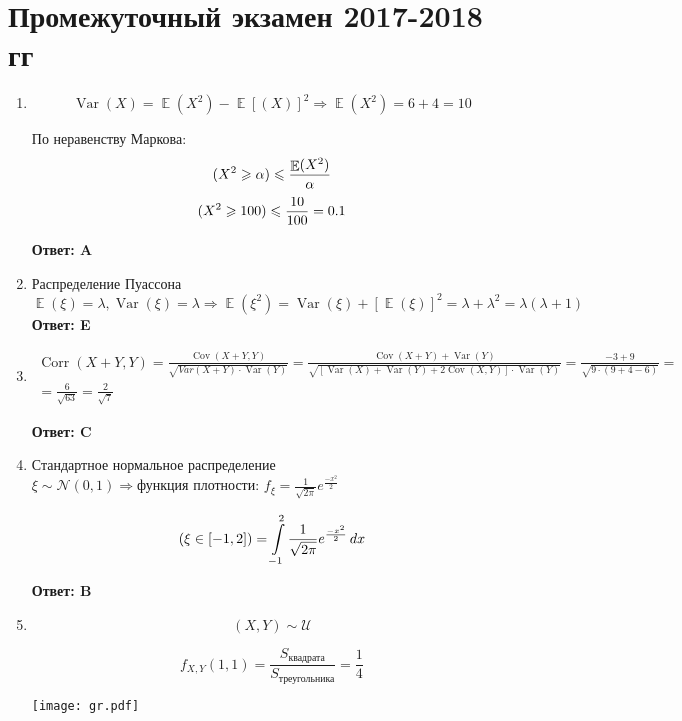 \documentclass[112pt, cmcyralt]{article}
\DeclareMathOperator{\Var}{Var}
\DeclareMathOperator{\Cov}{Cov}
\DeclareMathOperator{\Corr}{Corr}
\DeclareMathOperator{\E}{\mathbb{E}}
\let\P\relax
\DeclareMathOperator{\P}{\mathbb{P}}
\begin{document}
\section{Промежуточный экзамен 2017-2018 гг}
\begin{enumerate}

\item 

\[
\Var(X) = \E(X^2) - \E[(X)]^2 \Rightarrow  \E(X^2) = 6 + 4 = 10
\]

По неравенству Маркова:
\[
\P (X^2 \geqslant \alpha) \leqslant \frac {\E(X^2)}{\alpha}
\]
\[
\P (X^2\geqslant 100) \leqslant \frac{10}{100} = 0.1
\]

\textbf{Ответ: A}


\item 

Распределение Пуассона \Rightarrow 
$\E(\xi) = \lambda, \Var(\xi) = \lambda \Rightarrow \E(\xi^2) = \Var(\xi) + [\E(\xi)]^2= \lambda + \lambda^2 = \lambda(\lambda+1)$\\


\textbf{Ответ: E}


\item 

\begin{align*}
\Corr(X+Y,Y)=\frac{\Cov(X+Y,Y)}{\sqrt{Var(X+Y)\cdot \Var(Y)}}=\frac{\Cov(X+Y)+\Var(Y)}{\sqrt{[\Var(X)+\Var(Y)+2\Cov(X,Y)]\cdot \Var(Y)}}=\frac{-3+9}{\sqrt{9\cdot(9+4-6)}}=\\=\frac{6}{\sqrt{63}}=\frac{2}{\sqrt{7}}
\end{align*}

\textbf{Ответ: C}


\item 

Стандартное нормальное распределение \Rightarrow 
$\xi \sim \mathcal{N}(0,1) \Rightarrow \text{функция плотности: } f_\xi=\frac{1}{\sqrt{2\pi}}e^\frac{-x^2}{2}$

\[
\P(\xi\in[-1,2]) = \int\limits_{-1}^{2}\frac{1}{\sqrt{2\pi}}e^\frac{-x^2}{2}\,dx
\]

\textbf{Ответ: B}


\item 

\[
(X,Y)\sim\mathcal{U}
\]

\[
f_{X,Y}(1,1 )= \frac{S_\text{квадрата}}{S_\text{треугольника}} = \frac{1}{4}
\]
\begin{center}
   \texttt{[image: gr.pdf]} 
\end{center}



\end{enumerate}
\end{document}
